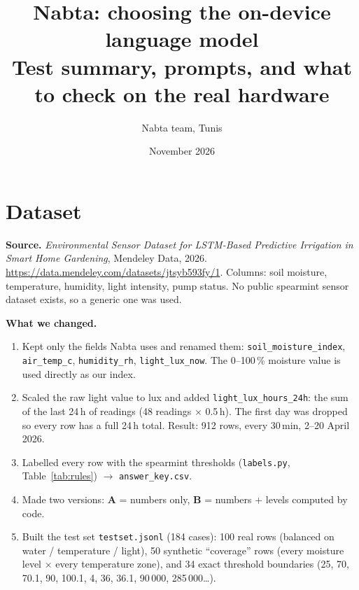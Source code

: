\documentclass[10pt,a4paper]{article}
\title{\textbf{Nabta: choosing the on-device language model}\\[2pt]\large Test summary, prompts, and what to check on the real hardware}
\author{Nabta team, Tunis}
\date{November 2026}
\begin{document}
\maketitle
\vspace{-6mm}

\section{Dataset}

\textbf{Source.} \emph{Environmental Sensor Dataset for LSTM-Based Predictive Irrigation in Smart Home Gardening},
Mendeley Data, 2026. \url{https://data.mendeley.com/datasets/jtsyb593fy/1}.
Columns: soil moisture, temperature, humidity, light intensity, pump status.
No public spearmint sensor dataset exists, so a generic one was used.

\textbf{What we changed.}
\begin{enumerate}
  \item Kept only the fields Nabta uses and renamed them: \texttt{soil\_moisture\_index}, \texttt{air\_temp\_c},
        \texttt{humidity\_rh}, \texttt{light\_lux\_now}. The 0--100\,\% moisture value is used directly as our index.
  \item Scaled the raw light value to lux and added \texttt{light\_lux\_hours\_24h}: the sum of the last 24\,h of
        readings (48 readings $\times$ 0.5\,h). The first day was dropped so every row has a full 24\,h total.
        Result: 912 rows, every 30\,min, 2--20 April 2026.
  \item Labelled every row with the spearmint thresholds (\texttt{labels.py}, Table~\ref{tab:rules})
        $\rightarrow$ \texttt{answer\_key.csv}.
  \item Made two versions: \textbf{A} = numbers only, \textbf{B} = numbers + levels computed by code.
  \item Built the test set \texttt{testset.jsonl} (184 cases): 100 real rows (balanced on water / temperature / light),
        50 synthetic ``coverage'' rows (every moisture level $\times$ every temperature zone), and 34 exact threshold
        boundaries (25, 70, 70.1, 90, 100.1, 4, 36, 36.1, 90\,000, 285\,000\dots).
\end{enumerate}
\end{document}
